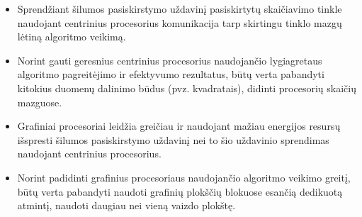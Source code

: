 \documentclass{VUMIFPSbakalaurinis}
\begin{document}
\begin{itemize}
    \item Sprendžiant šilumos pasiskirstymo uždavinį pasiskirtytų skaičiavimo tinkle naudojant centrinius procesorius komunikacija tarp skirtingu tinklo mazgų lėtiną algoritmo veikimą.
    \item Norint gauti geresnius centrinius procesorius naudojančio lygiagretaus algoritmo pagreitėjimo ir efektyvumo rezultatus, būtų verta pabandyti kitokius duomenų dalinimo būdus (pvz. kvadratais), didinti procesorių skaičių mazguose.
    \item Grafiniai procesoriai leidžia greičiau ir naudojant mažiau energijos resursų išspresti šilumos pasiskirstymo uždavinį nei to šio uždavinio sprendimas naudojant centrinius procesorius.
    \item Norint padidinti grafinius procesoriaus naudojančio algoritmo veikimo greitį, būtų verta pabandyti naudoti grafinių plokščių blokuose esančią dedikuotą atmintį, naudoti daugiau nei vieną vaizdo plokštę.
\end{itemize}

\end{document}
